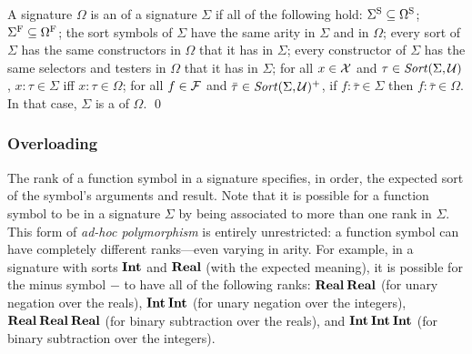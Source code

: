 \begin{definition}[Signature expansions] 

A signature $\Omega$ is an  of a signature $\Sigma$
if all of the following hold:
$\Sigma^\mathrm{S} \subseteq \Omega^\mathrm{S}$;
$\Sigma^\mathrm{F} \subseteq \Omega^\mathrm{F}$;
the sort symbols of $\Sigma$ have the same arity in $\Sigma$ and in $\Omega$;
every sort of $\Sigma$ has the same constructors in $\Omega$ that it has in $\Sigma$;
every constructor of $\Sigma$ has the same selectors and testers in $\Omega$ 
that it has in $\Sigma$;
for all $x \in \mathcal{X}$ and $\tau \in \mathit{Sort}(\Sigma, \mathcal{U})$,
$x{:}\tau \in \Sigma$ iff $x{:}\tau \in \Omega$;
for all $f \in \mathcal{F}$ and $\bar{\tau} \in \mathit{Sort}(\Sigma, \mathcal{U})^+$,
if $f{:}\bar{\tau} \in \Sigma$ then $f{:}\bar{\tau} \in \Omega$.
In that case, $\Sigma$ is a  of $\Omega$.
\qed
\end{definition}


\subsubsection{Overloading}
The rank of a function symbol in a signature specifies, in order,
the expected sort of the symbol's arguments and result.
Note that it is possible for a function symbol
to be  in a signature $\Sigma$
by being associated to more than one rank in $\Sigma$.
This form of \emph{ad-hoc polymorphism} is entirely unrestricted: 
a function symbol can have completely different ranks---even varying in arity. 
For example,
in a signature with sorts $\textbf{Int}$ and $\textbf{Real}$ (with the expected meaning),
it is possible for the minus symbol $-$ to have all of the following ranks:  
$\textbf{Real}\:\textbf{Real}$ (for unary negation over the reals),
$\textbf{Int}\:\textbf{Int}$ (for unary negation over the integers),
$\textbf{Real}\:\textbf{Real}\:\textbf{Real}$ (for binary subtraction over the reals),
and
$\textbf{Int}\:\textbf{Int}\:\textbf{Int}$ (for binary subtraction over the integers).

